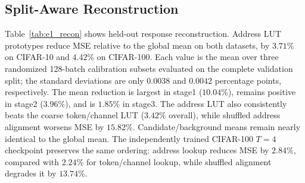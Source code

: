 \begin{table}[t]
\centering
\footnotesize
{}
\caption{E0 address feasibility diagnostics. Lower conditional variance
indicates that responses are more predictable within Q/K-derived buckets.}
\label{tab:e0_feasibility}
\end{table}

\subsection{Split-Aware Reconstruction}
\label{sec:e1_results}

Table~\ref{tab:e1_recon} shows held-out response reconstruction. Address LUT
prototypes reduce MSE relative to the global mean on both datasets, by
$3.71\%$ on CIFAR-10 and $4.42\%$ on CIFAR-100. Each value is the mean over
three randomized 128-batch calibration subsets evaluated on the complete
validation split; the standard deviations are only $0.0038$ and $0.0042$
percentage points, respectively.
The mean reduction is largest in stage1 ($10.04\%$), remains positive in
stage2 ($3.96\%$), and is $1.85\%$ in stage3. The address LUT also consistently
beats the coarse token/channel LUT ($3.42\%$ overall), while shuffled address
alignment worsens MSE by $15.82\%$. Candidate/background means remain nearly
identical to the global mean.
The independently trained CIFAR-100 $T=4$ checkpoint preserves the same
ordering: address lookup reduces MSE by $2.84\%$, compared with $2.24\%$ for
token/channel lookup, while shuffled alignment degrades it by $13.74\%$.

